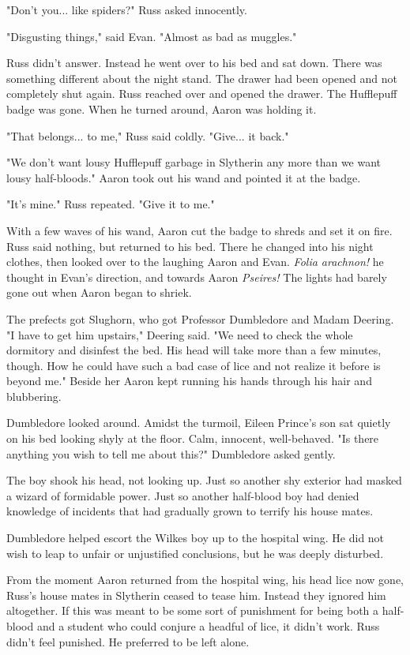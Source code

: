 \documentclass[a4paper,11pt]{article}
\begin{document}
"Don't you... like spiders?" Russ asked innocently.

"Disgusting things," said Evan. "Almost as bad as muggles."

Russ didn't answer. Instead he went over to his bed and sat down. There was something different about the night stand. The drawer had been opened and not completely shut again. Russ reached over and opened the drawer. The Hufflepuff badge was gone. When he turned around, Aaron was holding it.

"That belongs... to me," Russ said coldly. "Give... it back."

"We don't want lousy Hufflepuff garbage in Slytherin any more than we want lousy half-bloods." Aaron took out his wand and pointed it at the badge.

"It's mine." Russ repeated. "Give it to me."

With a few waves of his wand, Aaron cut the badge to shreds and set it on fire. Russ said nothing, but returned to his bed. There he changed into his night clothes, then looked over to the laughing Aaron and Evan. \emph{Folia arachnon!} he thought in Evan's direction, and towards Aaron \emph{Pseires!} The lights had barely gone out when Aaron began to shriek.

The prefects got Slughorn, who got Professor Dumbledore and Madam Deering. "I have to get him upstairs," Deering said. "We need to check the whole dormitory and disinfest the bed. His head will take more than a few minutes, though. How he could have such a bad case of lice and not realize it before is beyond me." Beside her Aaron kept running his hands through his hair and blubbering.

Dumbledore looked around. Amidst the turmoil, Eileen Prince's son sat quietly on his bed looking shyly at the floor. Calm, innocent, well-behaved. "Is there anything you wish to tell me about this?" Dumbledore asked gently.

The boy shook his head, not looking up. Just so another shy exterior had masked a wizard of formidable power. Just so another half-blood boy had denied knowledge of incidents that had gradually grown to terrify his house mates.

Dumbledore helped escort the Wilkes boy up to the hospital wing. He did not wish to leap to unfair or unjustified conclusions, but he was deeply disturbed.

From the moment Aaron returned from the hospital wing, his head lice now gone, Russ's house mates in Slytherin ceased to tease him. Instead they ignored him altogether. If this was meant to be some sort of punishment for being both a half-blood and a student who could conjure a headful of lice, it didn't work. Russ didn't feel punished. He preferred to be left alone.
\end{document}
